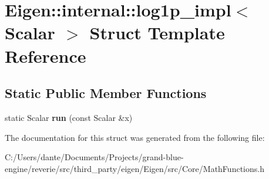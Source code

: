 \hypertarget{struct_eigen_1_1internal_1_1log1p__impl}{}\section{Eigen\+::internal\+::log1p\+\_\+impl$<$ Scalar $>$ Struct Template Reference}
\label{struct_eigen_1_1internal_1_1log1p__impl}
\subsection*{Static Public Member Functions}
\begin{DoxyCompactItemize}
\item 
\mbox{\label{struct_eigen_1_1internal_1_1log1p__impl_aae148a329894f9ddcdd1bba98296e7ab}} 
static Scalar {\bfseries run} (const Scalar \&x)
\end{DoxyCompactItemize}


The documentation for this struct was generated from the following file\+:\begin{DoxyCompactItemize}
\item 
C\+:/\+Users/dante/\+Documents/\+Projects/grand-\/blue-\/engine/reverie/src/third\+\_\+party/eigen/\+Eigen/src/\+Core/Math\+Functions.\+h\end{DoxyCompactItemize}
